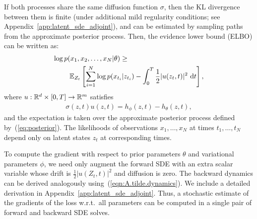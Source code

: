 \documentclass[twoside]{article}
\begin{document}
If both processes share the same diffusion function $\sigma$, then the KL divergence between them is finite (under additional mild regularity conditions; see Appendix~\ref{app:latent_sde_adjoint}), and can be estimated by sampling paths from the approximate posterior process.
Then, the evidence lower bound (ELBO) can be written as:
\begin{align}
\label{eq:variational_free_energy}
\log p(x_1, x_2, \dots, x_N | \theta) \geq \qquad\qquad\qquad\qquad\qquad\quad \\
\mathbb{E}_{Z_t} \left[
    \sum_{i=1}^N \log p( x_{t_i} | z_{t_{i}} )
    -\int_0^T \frac{1}{2} |u(z_t, t)|^2 \,\mathop{\mathrm{d}\!} t \right], \nonumber
\end{align}
where $u: \mathbb{R}^d \times [0, T] \to \mathbb{R}^m$ satisfies
\begin{align}
\sigma(z, t) u(z, t) = h_\phi(z, t) - h_\theta(z, t),
\end{align}
and the expectation is taken over the approximate posterior process defined by~(\ref{eq:posterior}).
The likelihoods of observations $x_1, \dots, x_N$ at times $t_1, \dots, t_N$ depend only on latent states $z_t$ at corresponding times.

To compute the gradient with respect to prior parameters $\theta$ and variational parameters $\phi$, we need only augment the forward SDE with an extra scalar variable whose drift is $\frac{1}{2} |u(Z_t, t)|^2$ and diffusion is zero.
The backward dynamics can be derived analogously using~(\ref{eqn:A.tilde.dynamics}). 
We include a detailed derivation in Appendix~\ref{app:latent_sde_adjoint}.
Thus, a stochastic estimate of the gradients of the loss w.r.t.\ all parameters can be computed in a single pair of forward and backward SDE solves.
\end{document}
